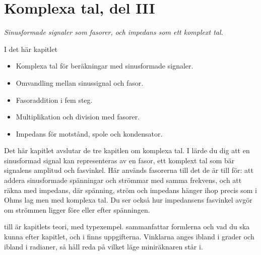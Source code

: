 
\chapter{Komplexa tal, del III}
\label{c17:ch}

{\large\itshape Sinusformade signaler som fasorer, och impedans som ett komplext tal.\par}

\begin{chapterbox}{I det här kapitlet}
\begin{itemize}
  \item Komplexa tal för beräkningar med sinusformade signaler.
  \item Omvandling mellan sinussignal och fasor.
  \item Fasoraddition i fem steg.
  \item Multiplikation och division med fasorer.
  \item Impedans för motstånd, spole och kondensator.
\end{itemize}
\end{chapterbox}

Det här kapitlet avslutar de tre kapitlen om komplexa tal. I  lärde du dig att en
sinusformad signal kan representeras av en fasor, ett komplext tal som bär signalens amplitud och
fasvinkel. Här används fasorerna till det de är till för: att addera sinusformade spänningar och
strömmar med samma frekvens, och att räkna med impedans, där spänning, ström och impedans hänger
ihop precis som i Ohms lag men med komplexa tal. Du ser också hur impedansens fasvinkel avgör om
strömmen ligger före eller efter spänningen.

 till  är kapitlets teori, med typexempel.
 sammanfattar formlerna och vad du ska kunna efter kapitlet, och i
 finns uppgifterna. Vinklarna anges ibland i grader och ibland i
radianer, så håll reda på vilket läge miniräknaren står i.




